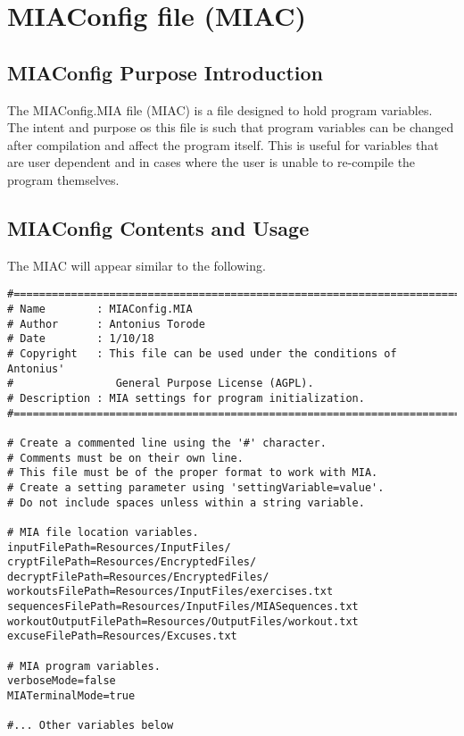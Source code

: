 \chapter{MIAConfig file (MIAC)} \label{MIAC}
\pagestyle{fancy}

\lstset{language=Python}

\section{MIAConfig Purpose Introduction}

The MIAConfig.MIA file (MIAC) is a file designed to hold program variables. The intent and purpose os this file is such that program variables can be changed after compilation and affect the program itself. This is useful for variables that are user dependent and in cases where the user is unable to re-compile the program themselves. 

\section{MIAConfig Contents and Usage}

The MIAC will appear similar to the following.

\begin{lstlisting}
#============================================================================
# Name        : MIAConfig.MIA
# Author      : Antonius Torode
# Date        : 1/10/18
# Copyright   : This file can be used under the conditions of Antonius' 
#				 General Purpose License (AGPL).
# Description : MIA settings for program initialization.
#============================================================================

# Create a commented line using the '#' character. 
# Comments must be on their own line.
# This file must be of the proper format to work with MIA.
# Create a setting parameter using 'settingVariable=value'.
# Do not include spaces unless within a string variable. 

# MIA file location variables.
inputFilePath=Resources/InputFiles/
cryptFilePath=Resources/EncryptedFiles/
decryptFilePath=Resources/EncryptedFiles/
workoutsFilePath=Resources/InputFiles/exercises.txt
sequencesFilePath=Resources/InputFiles/MIASequences.txt
workoutOutputFilePath=Resources/OutputFiles/workout.txt
excuseFilePath=Resources/Excuses.txt

# MIA program variables.
verboseMode=false
MIATerminalMode=true

#... Other variables below
\end{lstlisting}

